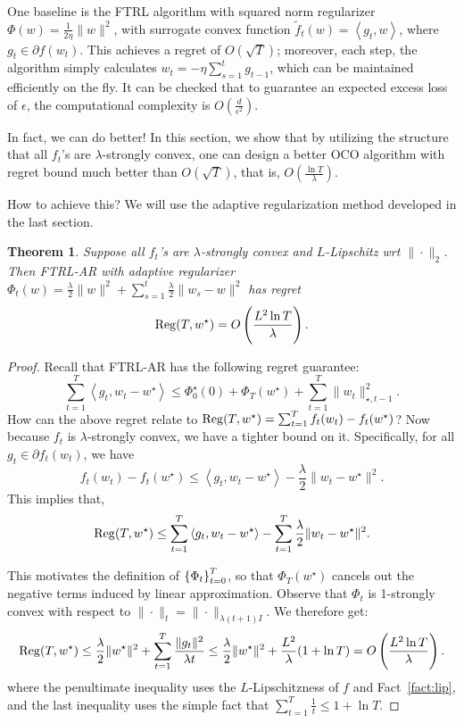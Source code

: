 \documentclass{article}
\newtheorem{theorem}{Theorem}
\DeclareMathOperator*{\Reg}{{\rm Reg}}
\newcommand{\inner}[2]{\left\langle #1,#2 \right\rangle}
\begin{document}
One baseline is the FTRL algorithm with squared norm regularizer $\Phi(w) = \frac{1}{2\eta}\|w\|^2$, with surrogate convex function $\tilde{f}_t(w) = \inner{g_t}{w}$, where $g_t \in \partial f(w_t)$. This achieves a regret of $O(\sqrt{T})$; moreover, each step, the algorithm simply calculates $w_t = - \eta \sum_{s=1}^t g_{t-1}$, which can be maintained efficiently on the fly. It can be checked that to guarantee an expected excess loss of $\epsilon$, the computational complexity is $O(\frac{d}{\epsilon^2})$.

In fact, we can do better! In this section, we show that by utilizing the structure that all $f_t$'s are $\lambda$-strongly convex, one can design a better OCO algorithm with regret bound much better than $O(\sqrt{T})$, that is, $O(\frac{\ln T}{\lambda})$.

How to achieve this? We will use the adaptive regularization method developed in the last section.
\begin{theorem}
Suppose all $f_t$'s are $\lambda$-strongly convex and $L$-Lipschitz wrt $\| \cdot \|_2$. Then FTRL-AR with adaptive regularizer $\Phi_t(w) = \frac\lambda 2\| w \|^2 + \sum_{s=1}^t \frac\lambda 2\| w_s - w \|^2$ has regret
\[ \Reg(T, w^\star) = O\del{\frac{L^2 \ln T}{\lambda}}. \]
\label{thm:log-ftrl-ar}
\end{theorem}
\begin{proof}
Recall that FTRL-AR has the following regret guarantee:
\[ \sum_{t=1}^T \inner{g_t}{w_t - w^\star} \leq \Phi_0^\star(0) + \Phi_T(w^\star) + \sum_{t=1}^T \| w_t \|_{\star, t-1}^2. \]
How can the above regret relate to $\Reg(T, w^\star) = \sum_{t=1}^T f_t(w_t) - f_t(w^\star)$? Now because $f_t$ is $\lambda$-strongly convex, we have a tighter bound on it. Specifically, for all $g_t \in \partial f_t(w_t)$, we have
\[ f_t(w_t) - f_t(w^\star) \leq \inner{g_t}{w_t - w^\star} - \frac\lambda 2\| w_t - w^\star \|^2. \]
This implies that,
\[ \Reg(T, w^\star) \leq \sum_{t=1}^T \inner{g_t}{w_t - w^\star} - \sum_{t=1}^T \frac\lambda 2\| w_t - w^\star \|^2. \]

This motivates the definition of $\cbr{\Phi_t}_{t=0}^T$, so that $\Phi_T(w^\star)$ cancels out the negative terms induced by linear approximation.
Observe that $\Phi_t$ is 1-strongly convex with respect to $\| \cdot \|_t = \| \cdot \|_{\lambda(t+1) I}$.
We therefore get:
\[ \Reg(T, w^\star) \leq \frac{\lambda}{2}\|w^\star\|^2 + \sum_{t=1}^T \frac{\| g_t \|^2}{\lambda t} \leq \frac{\lambda}{2}\|w^\star\|^2 + \frac{L^2}{\lambda}(1 + \ln T) = O\del{\frac{L^2 \ln T}{\lambda}}. \]
where the penultimate inequality uses the $L$-Lipschitzness of $f$ and Fact~\ref{fact:lip}, and the last inequality uses the simple fact that $\sum_{t=1}^T \frac1t \leq 1 + \ln T$.
\end{proof}
\end{document}
